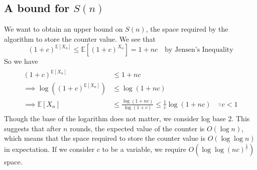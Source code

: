 \documentclass[9pt]{article}
\newcommand{\Expectation}[1]{\mathbb{E}\left[ #1 \right]}
\begin{document}
\subsection*{\textbf{A bound for $S(n)$}}
We want to obtain an upper bound on $S(n)$, the space required by the algorithm to store
the counter value. We see that
\begin{equation}
    (1 + c)^{\Expectation{X_{n}}} \leq \Expectation{(1 + c)^{X_{n}}} = 1 + nc
    \quad \text{by Jensen's Inequality}
\end{equation}
So we have
\begin{align}
    \begin{split}
        (1 + c)^{\Expectation{X_{n}}} &\leq 1 + nc \\
        \implies \log{\left( (1 + c)^{\Expectation{X_{n}}} \right)} &\leq \log{(1 + nc)} \\
        \implies \Expectation{X_{n}} &\leq \frac{\log{(1 + nc)}}{\log{(1 + c)}}
        \leq \frac{1}{c} \log{(1 + nc)} \quad \because c < 1
    \end{split}
\end{align}
Though the base of the logarithm does not matter, we consider log base 2.
This suggests that after $n$ rounds, the expected value of the counter is $O(\log{n})$, which
means that the space required to store the counter value is $O(\log{\log{n}})$ in expectation.
If we consider $c$ to be a variable, we require $O(\log{\log{(nc)^{\frac{1}{c}}}})$ space.
\end{document}
